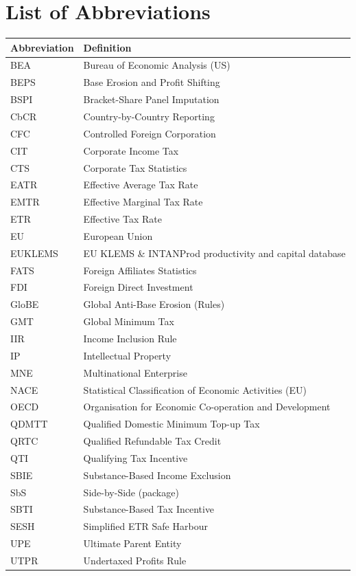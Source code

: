 \documentclass[11pt,a4paper]{article}
\begin{document}
\tableofcontents

\newpage
{}
{}
\listoftables

\newpage
{}
{}
\listoffigures

\newpage
{}
{}
\section*{List of Abbreviations}

\begin{tabular}{@{}ll@{}}
  \toprule
  \textbf{Abbreviation} & \textbf{Definition} \\
  \midrule
  BEA & Bureau of Economic Analysis (US) \\
  BEPS & Base Erosion and Profit Shifting \\
  BSPI & Bracket-Share Panel Imputation \\
  CbCR & Country-by-Country Reporting \\
  CFC & Controlled Foreign Corporation \\
  CIT & Corporate Income Tax \\
  CTS & Corporate Tax Statistics \\
  EATR & Effective Average Tax Rate \\
  EMTR & Effective Marginal Tax Rate \\
  ETR & Effective Tax Rate \\
  EU & European Union \\
  EUKLEMS & EU KLEMS \& INTANProd productivity and capital database \\
  FATS & Foreign Affiliates Statistics \\
  FDI & Foreign Direct Investment \\
  GloBE & Global Anti-Base Erosion (Rules) \\
  GMT & Global Minimum Tax \\
  IIR & Income Inclusion Rule \\
  IP & Intellectual Property \\
  MNE & Multinational Enterprise \\
  NACE & Statistical Classification of Economic Activities (EU) \\
  OECD & Organisation for Economic Co-operation and Development \\
  QDMTT & Qualified Domestic Minimum Top-up Tax \\
  QRTC & Qualified Refundable Tax Credit \\
  QTI & Qualifying Tax Incentive \\
  SBIE & Substance-Based Income Exclusion \\
  SbS & Side-by-Side (package) \\
  SBTI & Substance-Based Tax Incentive \\
  SESH & Simplified ETR Safe Harbour \\
  UPE & Ultimate Parent Entity \\
  UTPR & Undertaxed Profits Rule \\
  \bottomrule
\end{tabular}
\end{document}
